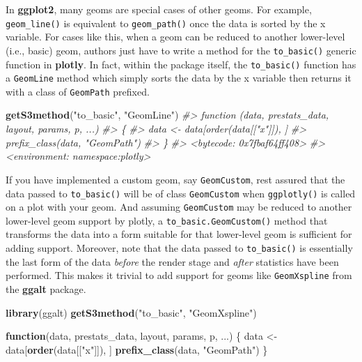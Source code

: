 \documentclass[
  12pt,
]{krantz}
\newenvironment{Shaded}{\begin{snugshade}}{\end{snugshade}}
\newcommand{\CommentTok}[1]{\textcolor[rgb]{0.56,0.35,0.01}{\textit{#1}}}
\newcommand{\ControlFlowTok}[1]{\textcolor[rgb]{0.13,0.29,0.53}{\textbf{#1}}}
\newcommand{\KeywordTok}[1]{\textcolor[rgb]{0.13,0.29,0.53}{\textbf{#1}}}
\newcommand{\NormalTok}[1]{#1}
\newcommand{\StringTok}[1]{\textcolor[rgb]{0.31,0.60,0.02}{#1}}
\begin{document}
In \textbf{ggplot2}, many geoms are special cases of other geoms. For example, \texttt{geom\_line()} is equivalent to \texttt{geom\_path()} once the data is sorted by the x variable. For cases like this, when a geom can be reduced to another lower-level (i.e., basic) geom, authors just have to write a method for the \texttt{to\_basic()} generic function in \textbf{plotly}. In fact, within the package itself, the \texttt{to\_basic()} function has a \texttt{GeomLine} method which simply sorts the data by the x variable then returns it with a class of \texttt{GeomPath} prefixed.

\begin{Shaded}
\begin{Highlighting}[]
\KeywordTok{getS3method}\NormalTok{(}\StringTok{"to_basic"}\NormalTok{, }\StringTok{"GeomLine"}\NormalTok{)}
\CommentTok{#> function (data, prestats_data, layout, params, p, ...) }
\CommentTok{#> \{}
\CommentTok{#>     data <- data[order(data[["x"]]), ]}
\CommentTok{#>     prefix_class(data, "GeomPath")}
\CommentTok{#> \}}
\CommentTok{#> <bytecode: 0x7fbaf64ff408>}
\CommentTok{#> <environment: namespace:plotly>}
\end{Highlighting}
\end{Shaded}

If you have implemented a custom geom, say \texttt{GeomCustom}, rest assured that the data passed to \texttt{to\_basic()} will be of class \texttt{GeomCustom} when \texttt{ggplotly()} is called on a plot with your geom. And assuming \texttt{GeomCustom} may be reduced to another lower-level geom support by plotly, a \texttt{to\_basic.GeomCustom()} method that transforms the data into a form suitable for that lower-level geom is sufficient for adding support. Moreover, note that the data passed to \texttt{to\_basic()} is essentially the last form of the data \emph{before} the render stage and \emph{after} statistics have been performed. This makes it trivial to add support for geoms like \texttt{GeomXspline} from the \textbf{ggalt} package.

\begin{Shaded}
\begin{Highlighting}[]
\KeywordTok{library}\NormalTok{(ggalt)}
\KeywordTok{getS3method}\NormalTok{(}\StringTok{"to_basic"}\NormalTok{, }\StringTok{"GeomXspline"}\NormalTok{)}
\end{Highlighting}
\end{Shaded}

\begin{Shaded}
\begin{Highlighting}[]
\ControlFlowTok{function}\NormalTok{(data, prestats_data, layout, params, p, ...) \{}
\NormalTok{  data <-}\StringTok{ }\NormalTok{data[}\KeywordTok{order}\NormalTok{(data[[}\StringTok{"x"}\NormalTok{]]), ]}
  \KeywordTok{prefix_class}\NormalTok{(data, }\StringTok{"GeomPath"}\NormalTok{)}
\NormalTok{\}}
\end{Highlighting}
\end{Shaded}
\end{document}
